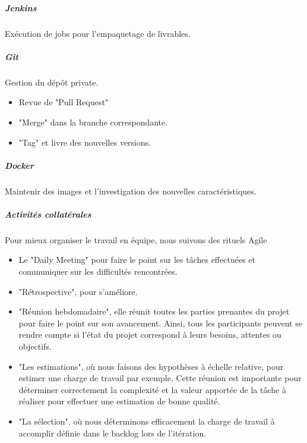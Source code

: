 \subparagraph{Jenkins} Exécution de jobs pour l'empaquetage de livrables.

\subparagraph{Git} Gestion du dépôt private.
\begin{itemize}
  \item Revue de "Pull Request"
  \item "Merge" dans la branche correspondante.
  \item "Tag" et livre des nouvelles versions.
\end{itemize}

\subparagraph{Docker} Maintenir des images et l'investigation des nouvelles caractéristiques.

\subparagraph{Activités collatérales} Pour mieux organiser le travail en équipe, nous suivons des rituels Agile
\begin{itemize}
  \item Le "Daily Meeting" pour faire le point sur les tâches effectuées et communiquer sur les difficultés rencontrées.
  \item "Rétrospective", pour s’améliore.
  \item "Réunion hebdomadaire",  elle réunit toutes les parties prenantes du projet pour faire le point sur son avancement. Ainsi, tous les participants peuvent se rendre compte si l’état du projet correspond à leurs besoins, attentes ou objectifs.
  \item "Les estimations", où nous faisons des hypothèses à échelle relative, pour estimer une charge de travail par exemple. Cette réunion est importante pour déterminer correctement la complexité et la valeur apportée de la tâche à réaliser pour effectuer une estimation de bonne qualité.
  \item "La sélection", où nous déterminons efficacement la charge de travail à accomplir définie dans le backlog lors de l'itération.
\end{itemize}

